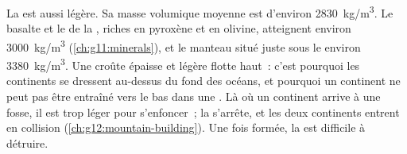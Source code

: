 La  est aussi légère. Sa masse volumique moyenne est
d'environ \qty{2830}{kg/m^3}. Le basalte et le  de la , riches en pyroxène et en olivine, atteignent environ
\qty{3000}{kg/m^3} (\cref{ch:g11:minerals}), et le manteau situé juste sous
le  environ \qty{3380}{kg/m^3}. Une croûte épaisse et légère flotte
haut~: c'est pourquoi les continents se dressent au-dessus du fond des
océans, et pourquoi un continent ne peut pas être entraîné vers le bas dans
une . Là où un continent arrive à une fosse, il est trop
léger pour s'enfoncer~; la  s'arrête, et les deux continents
entrent en collision (\cref{ch:g12:mountain-building}). Une fois formée, la
 est difficile à détruire.

